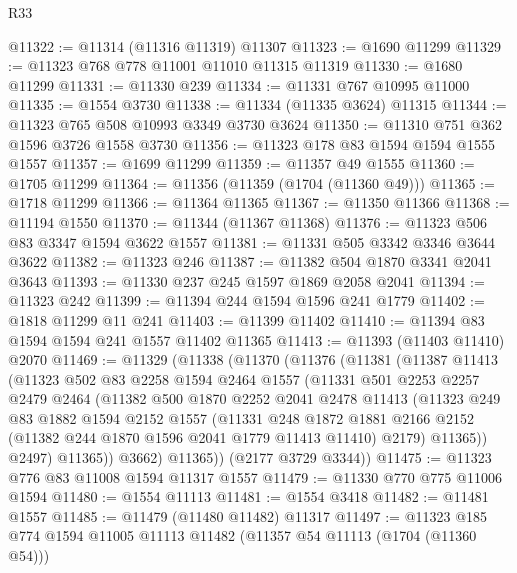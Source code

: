 \begin{lexlean}{R33}
\begin{coremodule}
@11322 := @11314 (@11316 @11319) @11307
@11323 := @1690 @11299
@11329 := @11323 @768 @778 @11001 @11010 @11315 @11319
@11330 := @1680 @11299
@11331 := @11330 @239
@11334 := @11331 @767 @10995 @11000
@11335 := @1554 @3730
@11338 := @11334 (@11335 @3624) @11315
@11344 := @11323 @765 @508 @10993 @3349 @3730 @3624
@11350 := @11310 @751 @362 @1596 @3726 @1558 @3730
@11356 := @11323 @178 @83 @1594 @1594 @1555 @1557
@11357 := @1699 @11299
@11359 := @11357 @49 @1555
@11360 := @1705 @11299
@11364 := @11356 (@11359 (@1704 (@11360 @49)))
@11365 := @1718 @11299
@11366 := @11364 @11365
@11367 := @11350 @11366
@11368 := @11194 @1550
@11370 := @11344 (@11367 @11368)
@11376 := @11323 @506 @83 @3347 @1594 @3622 @1557
@11381 := @11331 @505 @3342 @3346 @3644 @3622
@11382 := @11323 @246
@11387 := @11382 @504 @1870 @3341 @2041 @3643
@11393 := @11330 @237 @245 @1597 @1869 @2058 @2041
@11394 := @11323 @242
@11399 := @11394 @244 @1594 @1596 @241 @1779
@11402 := @1818 @11299 @11 @241
@11403 := @11399 @11402
@11410 := @11394 @83 @1594 @1594 @241 @1557 @11402 @11365
@11413 := @11393 (@11403 @11410) @2070
@11469 := @11329
    (@11338
      (@11370
        (@11376
          (@11381
            (@11387
              @11413
              (@11323
                @502
                @83
                @2258
                @1594
                @2464
                @1557
                (@11331
                  @501
                  @2253
                  @2257
                  @2479
                  @2464
                  (@11382
                    @500
                    @1870
                    @2252
                    @2041
                    @2478
                    @11413
                    (@11323
                      @249
                      @83
                      @1882
                      @1594
                      @2152
                      @1557
                      (@11331
                        @248
                        @1872
                        @1881
                        @2166
                        @2152
                        (@11382 @244 @1870 @1596 @2041 @1779 @11413 @11410)
                        @2179)
                      @11365))
                  @2497)
                @11365))
            @3662)
          @11365))
      (@2177 @3729 @3344))
@11475 := @11323 @776 @83 @11008 @1594 @11317 @1557
@11479 := @11330 @770 @775 @11006 @1594
@11480 := @1554 @11113
@11481 := @1554 @3418
@11482 := @11481 @1557
@11485 := @11479 (@11480 @11482) @11317
@11497 := @11323 @185 @774 @1594 @11005 @11113 @11482 (@11357 @54 @11113 (@1704 (@11360 @54)))

\end{coremodule}
\end{lexlean}
